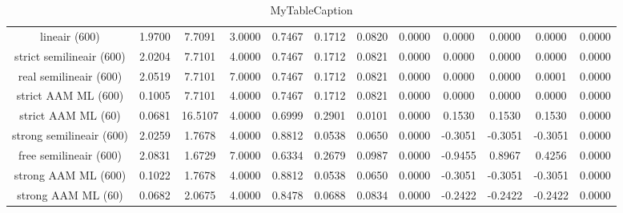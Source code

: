 \begin{table}
\centering
\begin{tabular}{|c|c|c|c|c|c|c|c|c|c|c|c|}
\hline
 &  &  &  &  &  &  &  &  &  &  &  \\
\hline
lineair (600) & 1.9700 & 7.7091 & 3.0000 & 0.7467 & 0.1712 & 0.0820 & 0.0000 & 0.0000 & 0.0000 & 0.0000 & 0.0000 \\
\hline
strict semilineair (600) & 2.0204 & 7.7101 & 4.0000 & 0.7467 & 0.1712 & 0.0821 & 0.0000 & 0.0000 & 0.0000 & 0.0000 & 0.0000 \\
\hline
real semilineair (600) & 2.0519 & 7.7101 & 7.0000 & 0.7467 & 0.1712 & 0.0821 & 0.0000 & 0.0000 & 0.0000 & 0.0001 & 0.0000 \\
\hline
strict AAM ML (600) & 0.1005 & 7.7101 & 4.0000 & 0.7467 & 0.1712 & 0.0821 & 0.0000 & 0.0000 & 0.0000 & 0.0000 & 0.0000 \\
\hline
strict AAM ML (60) & 0.0681 & 16.5107 & 4.0000 & 0.6999 & 0.2901 & 0.0101 & 0.0000 & 0.1530 & 0.1530 & 0.1530 & 0.0000 \\
\hline
strong semilineair (600) & 2.0259 & 1.7678 & 4.0000 & 0.8812 & 0.0538 & 0.0650 & 0.0000 & -0.3051 & -0.3051 & -0.3051 & 0.0000 \\
\hline
free semilineair (600) & 2.0831 & 1.6729 & 7.0000 & 0.6334 & 0.2679 & 0.0987 & 0.0000 & -0.9455 & 0.8967 & 0.4256 & 0.0000 \\
\hline
strong AAM ML (600) & 0.1022 & 1.7678 & 4.0000 & 0.8812 & 0.0538 & 0.0650 & 0.0000 & -0.3051 & -0.3051 & -0.3051 & 0.0000 \\
\hline
strong AAM ML (60) & 0.0682 & 2.0675 & 4.0000 & 0.8478 & 0.0688 & 0.0834 & 0.0000 & -0.2422 & -0.2422 & -0.2422 & 0.0000 \\
\hline
\end{tabular}
\caption{MyTableCaption}
\label{table:MyTableLabel}
\end{table}
